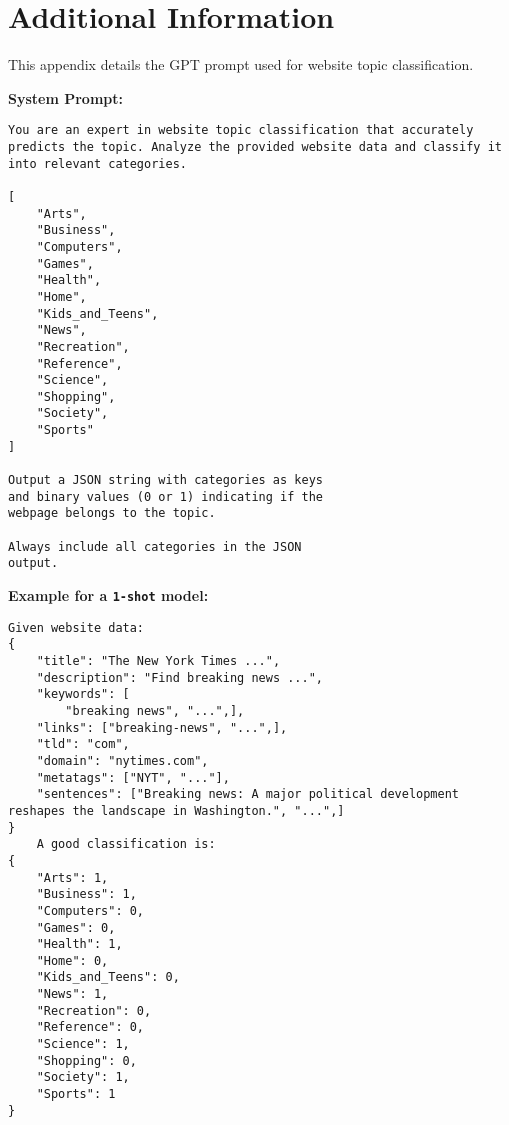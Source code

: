 \section{Additional Information}
\label{app:prompt}
This appendix details the GPT prompt used for website topic classification. 

\textbf{System Prompt:} 

\begin{lstlisting}
You are an expert in website topic classification that accurately predicts the topic. Analyze the provided website data and classify it into relevant categories.

[
    "Arts",
    "Business",
    "Computers",
    "Games",
    "Health",
    "Home", 
    "Kids_and_Teens",
    "News",
    "Recreation",
    "Reference",
    "Science", 
    "Shopping",
    "Society",
    "Sports"
]

Output a JSON string with categories as keys
and binary values (0 or 1) indicating if the 
webpage belongs to the topic. 

Always include all categories in the JSON
output.
\end{lstlisting}
\textbf{Example for a \texttt{1-shot} model:}
\begin{lstlisting}
Given website data:
{         
    "title": "The New York Times ...",
    "description": "Find breaking news ...",
    "keywords": [
        "breaking news", "...",],
    "links": ["breaking-news", "...",],
    "tld": "com",
    "domain": "nytimes.com",
    "metatags": ["NYT", "..."],
    "sentences": ["Breaking news: A major political development reshapes the landscape in Washington.", "...",]
}
    A good classification is:
{
    "Arts": 1,
    "Business": 1,
    "Computers": 0,
    "Games": 0,
    "Health": 1,
    "Home": 0,
    "Kids_and_Teens": 0,
    "News": 1,
    "Recreation": 0,
    "Reference": 0,
    "Science": 1,
    "Shopping": 0,
    "Society": 1,
    "Sports": 1
}
\end{lstlisting}


